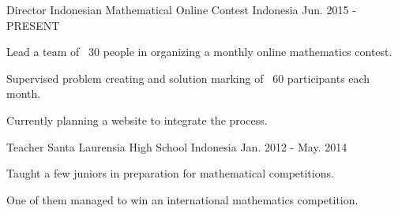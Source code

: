 

\begin{cventries}


\cventry
{Director} %
{Indonesian Mathematical Online Contest} %
{Indonesia} %
{Jun. 2015 - PRESENT} %
{ %
	\begin{cvitems}
		\item {Lead a team of ~30 people in organizing a monthly online mathematics contest.}
		\item {Supervised problem creating and solution marking of ~60 participants each month.}
		\item {Currently planning a website to integrate the process.}
	\end{cvitems}
}


\cventry
{Teacher} %
{Santa Laurensia High School} %
{Indonesia} %
{Jan. 2012 - May. 2014} %
{ %
	\begin{cvitems}
		\item {Taught a few juniors in preparation for mathematical competitions.}
		\item {One of them managed to win an international mathematics competition.}
	\end{cvitems}
}


\end{cventries}
